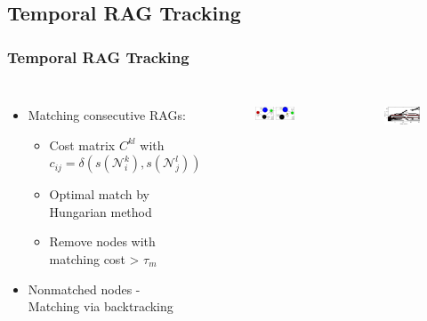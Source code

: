 \subsection{Temporal RAG Tracking}
\frame
{
	\frametitle{Temporal RAG Tracking}
	
	\begin{columns}[T]
		\hspace*{-1cm}

		\begin{itemize}
			\item Matching consecutive RAGs:  
			\begin{itemize}
				\item Cost matrix $C^{kl}$ with $c_{ij} = \delta(s(\mathcal{N}^k_i),s(\mathcal{N}^l_j) )  $
				\item Optimal match by Hungarian method
				\item Remove nodes with matching cost > $\tau_m$
			\end{itemize}
			\item Nonmatched nodes - \\ Matching via backtracking
		\end{itemize}
		

		

		
		\begin{figure}[p]
			\hspace*{-1.0cm}
			\includegraphics[width = 1.3\textwidth]{img/icsc/signature_graph.eps}
			\label{fig:signature_graph}
		\end{figure}
		\vspace*{-1.1cm}
		\begin{figure}[p]
			\hspace*{-2.5cm}
			\includegraphics[width = 1.8\textwidth]{img/icsc/node_continuity.eps}
			\label{fig:rag_tracking}
		\end{figure}
		
	\end{columns} 
	
}